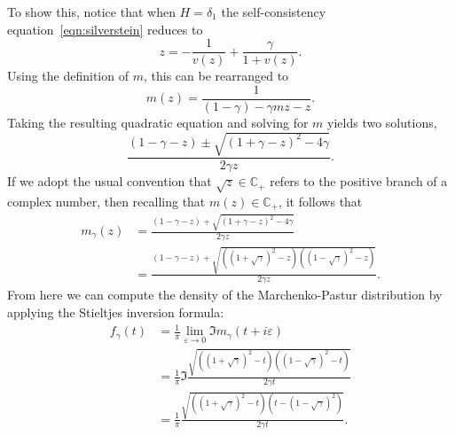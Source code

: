 \documentclass{article}
\begin{document}
To show this, notice that when $H = \delta_1$ the self-consistency equation~\eqref{eqn:silverstein} reduces to
$$
z = -\frac{1}{v(z)} + \frac{\gamma}{1 + v(z)}.
$$
Using the definition of $m$, this can be rearranged to 
$$
m(z)= \frac{1}{(1 - \gamma) - \gamma m z - z}.
$$
Taking the resulting quadratic equation and solving for $m$ yields two solutions, 
$$
\frac{(1 - \gamma - z) \pm \sqrt{(1 + \gamma - z)^2 - 4 \gamma}}{2 \gamma z}.
$$
If we adopt the usual convention that $\sqrt{z} \in \mathbb{C}_{+}$ refers to the positive branch of a complex number, then recalling that $m(z) \in \mathbb{C}_{+}$, it follows that 
\begin{align*}
m_{\gamma}(z) 
& = \frac{(1 - \gamma - z) + \sqrt{(1 + \gamma - z)^2 - 4 \gamma}}{2 \gamma z} \\
& = \frac{(1 - \gamma - z) + \sqrt{( (1 + \sqrt{\gamma})^2 - z)((1 - \sqrt{\gamma})^2 - z)}}{2 \gamma z}.
\end{align*}
From here we can compute the density of the Marchenko-Pastur distribution by applying the Stieltjes inversion formula:
\begin{align*}
f_{\gamma}(t) 
& = \frac{1}{\pi}\lim_{\varepsilon \to 0} \Im m_{\gamma}(t + i \varepsilon) \\
& = \frac{1}{\pi} \Im \frac{\sqrt{( (1 + \sqrt{\gamma})^2 - t)((1 - \sqrt{\gamma})^2 - t)}}{2 \gamma t} \\
& = \frac{1}{\pi} \frac{\sqrt{( (1 + \sqrt{\gamma})^2 - t)(t - (1 - \sqrt{\gamma})^2)}}{2 \gamma t}.
\end{align*}

	
	
\end{document}
